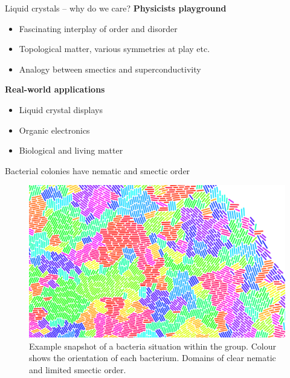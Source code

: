 \documentclass[10pt,mathserif]{beamer}
\newcommand{\subheading}[1]{\large\textbf{#1}\normalsize}
\begin{document}
\begin{frame}[fragile]{Liquid crystals -- why do we care?}
    \newrefsection
    \subheading{Physicists playground}
    \begin{itemize}
        \item Fascinating interplay of order and disorder
        \item Topological matter, various symmetries at play etc.
        \item Analogy between smectics and superconductivity\cite{degennesAnalogySuperconductorsSmectics1972}
    \end{itemize}
    \subheading{Real-world applications}
    \begin{itemize}
        \item Liquid crystal displays
        \item Organic electronics\cite{lagerwallNewEraLiquid2012}
        \item Biological and living matter\cite{lagerwallNewEraLiquid2012}
    \end{itemize}
    \vfill
    \printbibliography[heading=none]
    \vspace{-\fill}
\end{frame}

\begin{frame}[fragile]{Bacterial colonies have nematic and smectic order}
    \newrefsection
    \begin{figure}
        \centering
        \includegraphics[width=\textwidth]{figures/bio_laila1.png}
        \caption{
            Example snapshot of a bacteria situation within the group.
            Colour shows the orientation of each bacterium.
            Domains of clear nematic and limited smectic order.
        }
    \end{figure}
    \vfill
    \printbibliography[heading=none]
    \vspace{-\fill}
\end{frame}
\end{document}

